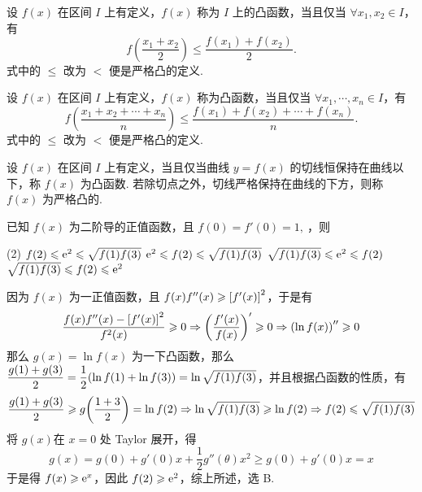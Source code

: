 \begin{definition}[凸函数 B]
    设 $ f(x) $ 在区间 $ I $ 上有定义，$f(x)$ 称为 $ I $ 上的凸函数，当且仅当 $ \forall x_{1} ,  x_{2} \in I$，有
    $$f\left(\frac{x_{1}+x_{2}}{2}\right) \leqslant \frac{f\left(x_{1}\right)+f\left(x_{2}\right)}{2} .$$
    式中的 $\leqslant$ 改为 $<$ 便是严格凸的定义.
\end{definition}

\begin{definition}[凸函数 C]
    设 $ f(x) $ 在区间 $ I $ 上有定义，$f(x) $ 称为凸函数，当且仅当 $ \forall x_{1}, \cdots, x_{n} \in   I$，有
    $$f\left(\frac{x_{1}+x_{2}+\cdots+x_{n}}{n}\right) \leqslant \frac{f\left(x_{1}\right)+f\left(x_{2}\right)+\cdots+f\left(x_{n}\right)}{n} .$$
    式中的 $\leqslant$ 改为 $<$ 便是严格凸的定义.
\end{definition}

\begin{definition}[凸函数 D]
    设 $ f(x) $ 在区间 $ I $ 上有定义，当且仅当曲线 $ y=f(x) $ 的切线恒保持在曲线以下，称 $ f(x) $ 为凸函数. 若除切点之外，切线严格保持在曲线的下方，则称 $ f(x) $ 为严格凸的.
\end{definition}

\begin{example}
    已知 $f(x)$ 为二阶导的正值函数，且 $f(0)=f'(0)=1,~$，则
    \begin{tasks}(2)
        \task $f(2)\leqslant \mathrm{e}^{2}\leqslant \sqrt{f(1)f(3)}$
        \task $\mathrm{e}^{2}\leqslant f(2)\leqslant \sqrt{f(1)f(3)}$
        \task $\sqrt{f(1)f(3)}\leqslant \mathrm{e}^{2}\leqslant f(2)$
        \task $\sqrt{f(1)f(3)}\leqslant f(2)\leqslant \mathrm{e}^{2}$
    \end{tasks}
\end{example}
\begin{solution}
    因为 $f(x)$ 为一正值函数，且 $f(x)f''(x)\geqslant \qty[f'(x)]^2$，于是有 $$\dfrac{f(x)f''(x)-\qty[f'(x)]^2}{f^2(x)}\geqslant 0\Rightarrow \qty(\dfrac{f'(x)}{f(x)})'\geqslant 0\Rightarrow \qty(\ln f(x))''\geqslant 0$$
    那么 $g(x)=\ln f(x)$ 为一下凸函数，那么 $\dfrac{g(1)+g(3)}{2}=\dfrac{1}{2}\qty(\ln f(1)+\ln f(3))=\ln\sqrt{f(1)f(3)}$，并且根据凸函数的性质，有 $$\dfrac{g(1)+g(3)}{2}\geqslant g\qty(\dfrac{1+3}{2})=\ln f(2)\Rightarrow \ln\sqrt{f(1)f(3)}\geqslant \ln f(2)\Rightarrow f(2)\leqslant \sqrt{f(1)f(3)}$$
    将 $g(x)$在 $x=0$ 处 Taylor 展开，得 $$g(x)=g(0)+g'(0)x+\dfrac{1}{2}g''(\theta)x^2\geqslant g(0)+g'(0)x=x$$
    于是得 $f(x)\geqslant \mathrm{e}^x$，因此 $f(2)\geqslant \mathrm{e}^2$，综上所述，选 B.
\end{solution}

